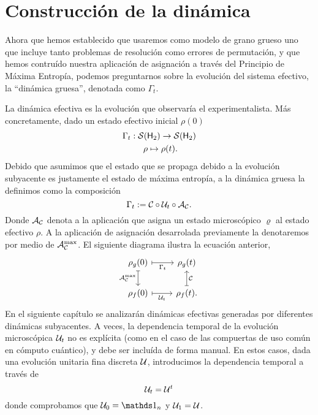 \section{Construcción de la dinámica}\label{sec:ch2dycon}

Ahora que hemos establecido que usaremos como modelo de grano grueso uno que incluye tanto problemas de resolución como errores de permutación, y que hemos contruído nuestra aplicación de asignación a través del Principio de Máxima Entropía, podemos preguntarnos sobre la evolución del sistema efectivo, la ``dinámica gruesa'', denotada como $\Gamma_t$.

La dinámica efectiva es la evolución que observaría el experimentalista. Más concretamente, dado un estado efectivo inicial $\rho(0)$
\begin{gather*}
\Gamma_{t}:\mcS(\hilbert_2)\rightarrow \mcS(\hilbert_2)\\
\rho \mapsto \rho(t)\rlap{.}
\end{gather*}
Debido que asumimos que el estado que se propaga debido a la evolución subyacente es justamente el estado de máxima entropía, a la dinámica gruesa la definimos como la composición
\begin{equation*}
\Gamma_t:=\mathcal{C} \circ \mathcal{U}_t \circ \mathcal{A}_{\mathcal{C}}.
\end{equation*}
Donde $\mathcal{A}_{\mathcal{C}}$ denota a la aplicación que asigna un estado microscópico $\varrho$ al estado efectivo $\rho$. A la aplicación de asignación desarrolada previamente la denotaremos por medio de $\mathcal{A}_{\mathcal{C}}^{\max}$. El siguiente diagrama ilustra la ecuación anterior,
\[\begin{tikzcd}[arrows={<-|}]
\rho_{g}(0)  & \rho_{g}(t) \arrow{l}{\Gamma_{t}} \arrow{d}{\mcC}\\
\rho_{f}(0) \arrow{u}{\mcA_{\mcC}^{\max}} & \rho_{f}(t). \arrow{l}{\mcU_{t}}
\end{tikzcd}
\]
En el siguiente capítulo se analizarán dinámicas efectivas generadas por diferentes dinámicas subyacentes. A veces, la dependencia temporal de la evolución microscópica $\mathcal{U}_{t}$ no es explícita (como en el caso de las compuertas de uso común en cómputo cuántico), y debe ser incluída de forma manual. En estos casos, dada una evolución unitaria fina discreta $\mathcal{U}$, introducimos la dependencia temporal a través de 
\begin{equation}\label{eq:UnitaryTimeDependence}
    \mathcal{U}_{t}=\mathcal{U}^{t}
\end{equation}
donde comprobamos que $\mcU_{0}=\Id_{n}$ y $\mathcal{U}_{1}=\mathcal{U}$.

